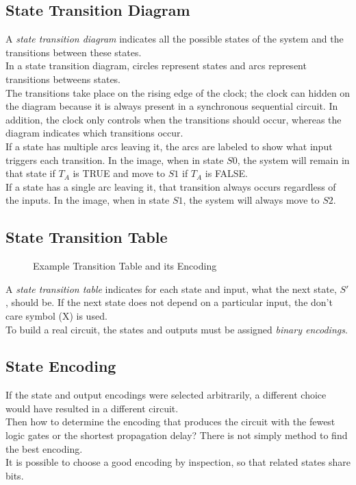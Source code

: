 \documentclass[12pt]{article}
\theoremstyle{definition}
\newcommand{\includePicture}[3]{
  \begin{figure}[!ht]
  \centering
  \scalebox{#1}{\texttt{[image: \#2]}}
  \caption{#3}
  \end{figure}
}
\begin{document}
  \subsection{State Transition Diagram}
  A \emph{state transition diagram} indicates all the possible states of the system and the transitions between these states. \\
  In a state transition diagram, circles represent states and arcs represent transitions betweens states. \\
  The transitions take place on the rising edge of the clock; the clock can hidden on the diagram because it is always present in a synchronous sequential circuit.
  In addition, the clock only controls when the transitions should occur, whereas the diagram indicates which transitions occur. \\
  If a state has multiple arcs leaving it, the arcs are labeled to show what input triggers each transition.
  In the image, when in state $S0$, the system will remain in that state if $T_{A}$ is TRUE and move to $S1$ if $T_{A}$ is FALSE. \\
  If a state has a single arc leaving it, that transition always occurs regardless of the inputs.
  In the image, when in state $S1$, the system will always move to $S2$. \\

  \subsection{State Transition Table}
  \includePicture{0.8}{pictures/stateTTableStateEncode.png}{Example Transition Table and its Encoding}
  A \emph{state transition table} indicates for each state and input, what the next state, $S'$, should be.
  If the next state does not depend on a particular input, the don't care symbol (X) is used. \\
  To build a real circuit, the states and outputs must be assigned \emph{binary encodings}.

  \subsection{State Encoding}
  If the state and output encodings were selected arbitrarily, a different choice would have resulted in a different circuit. \\
  Then how to determine the encoding that produces the circuit with the fewest logic gates or the shortest propagation delay?
  There is not simply method to find the best encoding. \\
  It is possible to choose a good encoding by inspection, so that related states share bits. \\
\end{document}
